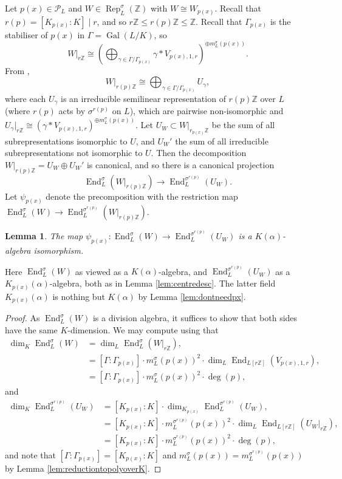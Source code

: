 \documentclass[10pt, reqno, hidelinks]{amsart}
\DeclareMathOperator{\Gal}{Gal}
\DeclareMathOperator{\Rep}{Rep}
\DeclareMathOperator{\End}{End}
\newcommand{\bZ}{{\mathbb Z}}
\newcommand{\sP}{{\mathcal P}}
\numberwithin{thm}{subsection}
\newtheorem{lemma}[thm]{Lemma}
\theoremstyle{definition}
\begin{document}
Let $p(x) \in \sP_L$ and $W \in \Rep_L^{\sigma}(\bZ)$ with $W \cong W_{p(x)}$. Recall that $r(p) = [K_{p(x)} : K] \mid r$, and so $r \bZ \leq r(p) \bZ \leq \bZ$. Recall that $\Gamma_{p(x)}$ is the stabiliser of $p(x)$ in $\Gamma = \Gal(L/K)$, so
\[
W|_{r \bZ} \cong \left( \bigoplus_{\gamma \in \Gamma / \Gamma_{p(x)}} \gamma * V_{p(x), 1, r} \right)^{\oplus m_L^{\sigma}(p(x))}.
\]
From \cite[Cor.\ 8.27]{TAYSchur}, 
\[
W|_{r(p) \bZ} \cong \bigoplus_{\gamma \in \Gamma / \Gamma_{p(x)}} U_{\gamma},
\]
where each $U_{\gamma}$ is an irreducible semilinear representation of $r(p)\bZ$ over $L$ (where $r(p)$ acts by $\sigma^{r(p)}$ on $L$), which are pairwise non-isomorphic and $U_{\gamma}|_{r \bZ} \cong (\gamma * V_{p(x), 1, r})^{\oplus m_L^{\sigma}(p(x))}$. Let $U_W \subset W|_{r_{p(x)} \bZ}$ be the sum of all subrepresentations isomorphic to $U$, and $U_W'$ the sum of all irreducible subrepresentations not isomorphic to $U$. Then the decomposition $W|_{r(p) \bZ} = U_W \oplus U_{W}'$ is canonical, and so there is a canonical projection
\[
\End_L^{\sigma}(W|_{r(p) \bZ}) \rightarrow \End_L^{\sigma^{r(p)}}(U_W).
\]
Let $\psi_{p(x)}$ denote the precomposition with the restriction map $\End_L^{\sigma}(W) \rightarrow \End_L^{\sigma^{r(p)}}(W|_{r(p) \bZ})$. 

\begin{lemma}\label{lem:psipxisom}
	The map $\psi_{p(x)} \colon \End_L^{\sigma}(W) \rightarrow \End_L^{\sigma^{r(p)}}(U_W)$ is a $K(\alpha)$-algebra isomorphism.
\end{lemma}

Here $\End_L^{\sigma}(W)$ as viewed as a $K(\alpha)$-algebra, and $\End_L^{\sigma^{r(p)}}(U_W)$ as a $K_{p(x)}(\alpha)$-algebra, both as in Lemma \ref{lem:centredesc}. The latter field $K_{p(x)}(\alpha)$ is nothing but $K(\alpha)$ by Lemma \ref{lem:dontneedpx}.

\begin{proof}
	As $\End_L^{\sigma}(W)$ is a division algebra, it suffices to show that both sides have the same $K$-dimension. We may compute using \cite[Thm.\ A]{TAYSchur} that
	\begin{align*}
	\dim_K \End_L^{\sigma}(W) &= \dim_L \End_L^{\sigma}(W|_{r \bZ}), \\
	 &= [\Gamma : \Gamma_{p(x)}] \cdot m_L^{\sigma}(p(x))^2 \cdot \dim_L \End_{L[r \bZ]}(V_{p(x), 1, r}), \\
	&= [\Gamma : \Gamma_{p(x)}] \cdot m_L^{\sigma}(p(x))^2 \cdot \deg(p),
	\end{align*}
	and
	\begin{align*}
	\dim_K \End_L^{\sigma^{r(p)}}(U_W) &= [K_{p(x)} : K] \cdot \dim_{K_{p(x)}} \End_L^{\sigma^{r(p)}}(U_W), \\
	&= [K_{p(x)} : K] \cdot m_L^{\sigma^{r(p)}}(p(x))^2 \cdot \dim_{L} \End_{L[r \bZ]}(U_W|_{r \bZ}), \\
	&= [K_{p(x)} : K] \cdot m_L^{\sigma^{r(p)}}(p(x))^2 \cdot \deg(p),
	\end{align*}
	and note that $[\Gamma : \Gamma_{p(x)}] = [K_{p(x)} : K]$ and $m_L^{\sigma}(p(x)) = m_L^{\sigma^{r(p)}}(p(x))$ by Lemma \ref{lem:reductiontopolyoverK}.
\end{proof}
\end{document}
